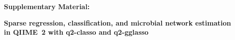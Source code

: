 \documentclass[11pt,a4paper]{article}
\newcommand{\code}[1]{\allowbreak\texttt{\hyphenchar\font=`\-\relax #1}}
\newcommand{\aff}[1]{\textsuperscript{\normalfont #1}}
\begin{document}
\begin{center}
{\Large\bfseries Supplementary Material:\par}
\vspace{0.4em}
{\large\bfseries Sparse regression, classification, and microbial network estimation\\
in QIIME~2 with q2-classo and q2-gglasso\par}
\end{center}
\vspace{0.7em}




{\small\hypersetup{linkcolor=black}\tableofcontents}
\clearpage


\clearpage
\end{document}
